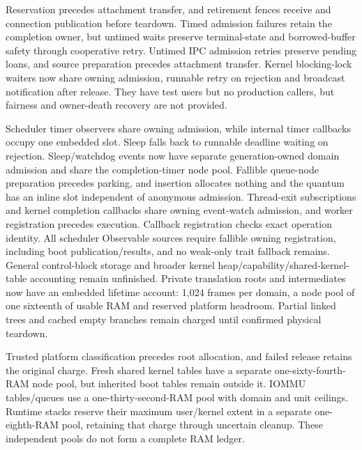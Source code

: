 \begin{itemize}
        Reservation precedes attachment transfer,
        and retirement fences receive and connection publication before teardown.
        Timed admission failures retain the completion owner, but untimed waits
        preserve terminal-state and borrowed-buffer safety through cooperative
        retry. Untimed IPC admission retries preserve pending loans, and source
        preparation precedes attachment transfer. Kernel blocking-lock waiters
        now share owning admission, runnable retry on rejection and broadcast
        notification after release. They have test users but no production
        callers, but fairness and owner-death recovery are not provided.
        
        Scheduler timer observers share owning admission, while internal timer
        callbacks occupy one embedded slot. Sleep falls back to runnable
        deadline waiting on rejection. Sleep/watchdog events now have separate
        generation-owned domain admission and share the completion-timer node
        pool. Fallible queue-node preparation precedes parking, and insertion
        allocates nothing and the quantum has an inline slot independent of
        anonymous admission. Thread-exit subscriptions and kernel completion
        callbacks share owning event-watch admission, and worker registration
        precedes execution. Callback registration checks exact operation
        identity. All scheduler Observable sources require fallible owning
        registration, including boot publication/results, and no weak-only trait
        fallback remains. General control-block storage and broader kernel
        heap/capability/shared-kernel-table accounting remain unfinished.
        Private translation roots and intermediates now have an embedded
        lifetime account: 1,024 frames per domain, a node pool of one sixteenth
        of usable RAM and reserved platform headroom. Partial linked trees and
        cached empty branches remain charged until confirmed physical teardown.
        
        Trusted platform classification precedes root allocation, and failed release
        retains the original charge. Fresh shared kernel tables have a separate
        one-sixty-fourth-RAM node pool, but inherited boot tables remain outside it.
        IOMMU tables/queues use a one-thirty-second-RAM pool with domain and unit
        ceilings. Runtime stacks reserve their maximum user/kernel extent in a
        separate one-eighth-RAM pool, retaining that charge through uncertain
        cleanup. These independent pools do not form a complete RAM ledger.
        

\end{itemize}
